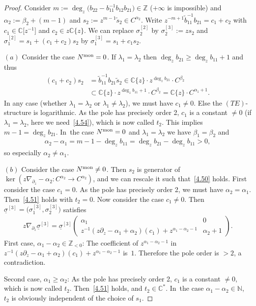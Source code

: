 \documentclass[pdftex]{sigma}%
\numberwithin{equation}{section}
\numberwithin{figure}{section}
\newcommand{\N}{{\mathbb N}}
\newcommand{\Z}{{\mathbb Z}}
\newcommand{\C}{{\mathbb C}}
\newcommand{\www}{\widetilde}
\newcommand{\uuuu}{\underline}
\newcommand{\paa}{\partial}
\newcommand{\nnn}{\nabla}
\begin{document}
\begin{proof}
Consider $m:=\deg_z\big(b_{22}-b_{11}^{-1}b_{12}b_{21}\big)\in\Z$
($+\infty$ is impossible) and
$\alpha_2:=\beta_2+(m-1)$ and
$s_2:=z^{m-1}\www s_2\in C^{\alpha_2}$.
Write $z^{-m+1}\www b_{11}^{-1}b_{21}=c_1+c_2$
with $c_1\in\C\big[z^{-1}\big]$ and $c_2\in z\C\{z\}$.
We can replace $\sigma_2^{[2]}$ by
$\sigma_2^{[3]}:=zs_2$
and $\sigma_1^{[2]}=s_1+(c_1+c_2)s_2$ by
$\sigma_1^{[3]}=s_1+c_1s_2$.

$(a)$ Consider the case $N^{\rm mon}=0$.
If $\lambda_1=\lambda_2$ then $\deg_z b_{21}\geq \deg_z b_{11}+1$
and thus
\begin{align}
(c_1+c_2)s_2&=\www{b}_{11}^{-1}b_{21}\www{s}_2\in
\C\{z\}\cdot z^{\deg_zb_{21}}\cdot C^{\beta_2}\nonumber
\\
&{}\subset \C\{z\}\cdot z^{\deg_zb_{11}+1}\cdot C^{\beta_2}
= \C\{z\}\cdot C^{\alpha_1+1}.\label{4.54}
\end{align}
In any case (whether $\lambda_1=\lambda_2$ or
$\lambda_1\neq \lambda_2$), we must have $c_1\neq 0$.
Else the $(TE)$-structure is logarithmic.
As the pole has precisely order 2, $c_1$ is a constant
$\neq 0$ (if $\lambda_1=\lambda_2$, here we need~\eqref{4.54}),
which is now called $t_2$. This implies $m-1=\deg_z b_{21}$. In~the case $N^{\rm mon}=0$ and $\lambda_1=\lambda_2$
we have $\beta_1=\beta_2$ and
\begin{gather*}
\alpha_2-\alpha_1=m-1-\deg_z b_{11}
=\deg_z b_{21}-\deg_z b_{11}> 0,%
\end{gather*}
so especially $\alpha_2\neq \alpha_1$.

$(b)$ Consider the case $N^{\rm mon}\neq 0$.
Then $s_2$ is generator of
$\ker(z\nnn_{\paa_z}-\alpha_2\colon C^{\alpha_2}\to C^{\alpha_2})$,
and we can rescale it such that~\eqref{4.50} holds.
First consider the case $c_1=0$.
As the pole has precisely order 2, we must have
$\alpha_2=\alpha_1$. Then~\eqref{4.51} holds with $t_2=0$.
Now consider the case $c_1\neq 0$. Then
$\uuuu{\sigma}^{[3]}=\big(\sigma_1^{[3]},\sigma_2^{[3]}\big)$ satisfies
\begin{gather*}%
z\nnn_{\paa_z}\uuuu{\sigma}^{[3]}=\uuuu{\sigma}^{[3]}
\begin{pmatrix}\alpha_1 & 0 \\
z^{-1}(z\paa_z-\alpha_1+\alpha_2)(c_1)
+z^{\alpha_1-\alpha_2-1}& \alpha_2+1
\end{pmatrix}\!.
\end{gather*}
First case, $\alpha_1-\alpha_2\in\Z_{<0}$:
The coefficient of $z^{\alpha_1-\alpha_2-1}$
in $z^{-1}(z\paa_z-\alpha_1+\alpha_2)(c_1)
+z^{\alpha_1-\alpha_2-1}$ is~$1$.
Therefore the pole order is $>2$, a contradiction.

Second case, $\alpha_1\geq \alpha_2$:
As the pole has precisely order 2, $c_1$ is a constant $\neq 0$,
which is now called $t_2$. Then~\eqref{4.51} holds,
and $t_2\in\C^*$. In~the case $\alpha_1-\alpha_2\in\N$,
$t_2$ is obviously independent of the choice of $s_1$.
\end{proof}
\end{document}
